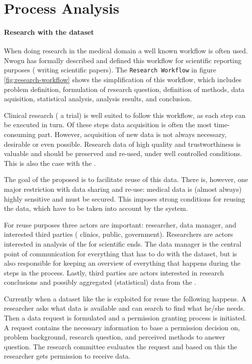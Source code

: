 \section{Process Analysis}
\label{process-analysis}

\paragraph{Research with the \project{} dataset}
When doing research in the medical domain a well known workflow is often used. Nwogu \cite{nwogu} has formally described and defined this workflow for scientific reporting purposes (\ie{} writing scientific papers).
The {\tt Research Workflow} in figure \ref{fig:research-workflow} shows the simplification of this workflow, which includes problem definition, formulation of research question, definition of methods, data aquisition, statistical analysis, analysis results, and conclusion.

Clinical research (\eg{} a trial) is well suited to follow this workflow, as each step can be executed in turn.
Of these steps data acquisition is often the most time-consuming part.
However, acquisition of new data is not always necessary,  desirable or even possible. 
Research data of high quality and trustworthiness is valuable and should be preserved and re-used, under well controlled conditions. 
This is also the case with the \projectdata{}.

The goal of the proposed \ivfsystem{} is to facilitate reuse of this data.
There is, however, one major restriction with data sharing and re-use: medical data is (almost always) highly sensitive and must be secured. 
This imposes strong conditions for reusing the data, which have to be taken into account by the system.

For reuse purposes three actors are important: researcher, data manager, and interested third parties (\eg{} clinics, public, government).
Researchers are actors interested in analysis of the \projectdata{} for scientific ends.
The data manager is the central point of communication for everything that has to do with the dataset, but is also responsible for keeping an overview of everything that happens during the steps in the process.
Lastly, third parties are actors interested in research conclusions and possibly aggregated (statistical) data from the \projectdata{}.

Currently when a dataset like the \projectdata{} is exploited for reuse the following happens.
A researcher asks what data is available and can search to find what he/she needs.
Then a data request is formulated and a permission granting process is initiated.
A request contains the necessary information to base a permission decision on, \eg{} problem background, research question, and perceived methods to answer question.
The research committee evaluates the request and based on this the researcher gets permission to receive data.

